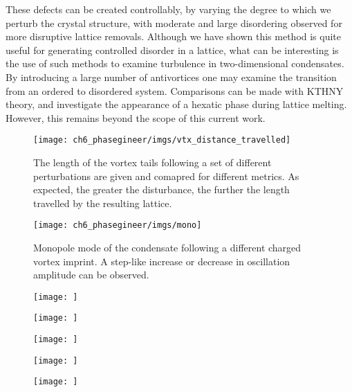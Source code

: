 These defects can be created controllably, by varying the degree to which we perturb the crystal structure, with moderate and large disordering observed for more disruptive lattice removals. Although we have shown this method is quite useful for generating controlled disorder in a lattice, what can be interesting is the use of such methods to examine turbulence in two-dimensional condensates. By introducing a large number of antivortices one may examine the transition from an ordered to disordered system. Comparisons can be made with KTHNY theory, and investigate the appearance of a hexatic phase during lattice melting. However, this remains beyond the scope of this current work.

\begin{figure}\centering
    \texttt{[image: ch6\_phasegineer/imgs/vtx\_distance\_travelled]}
    \caption{The length of the vortex tails following a set of different perturbations are given and comapred for different metrics. As expected, the greater the disturbance, the further the length travelled by the resulting lattice.}\label{fig:vtx_dist_travelled}
\end{figure}

\begin{figure}\centering
    \texttt{[image: ch6\_phasegineer/imgs/mono]}
    \caption{Monopole mode of the condensate following a different charged vortex imprint. A step-like increase or decrease in oscillation amplitude can be observed.}\label{fig:monopoles}
\end{figure}

\begin{figure}\centering
    \texttt{[image: ]}
    \caption{}\label{}
\end{figure}

\begin{figure}\centering
    \texttt{[image: ]}
    \caption{}\label{}
\end{figure}

\begin{figure}\centering
    \texttt{[image: ]}
    \caption{}\label{}
\end{figure}

\begin{figure}\centering
    \texttt{[image: ]}
    \caption{}\label{}
\end{figure}

\begin{figure}\centering
    \texttt{[image: ]}
    \caption{}\label{}
\end{figure}
